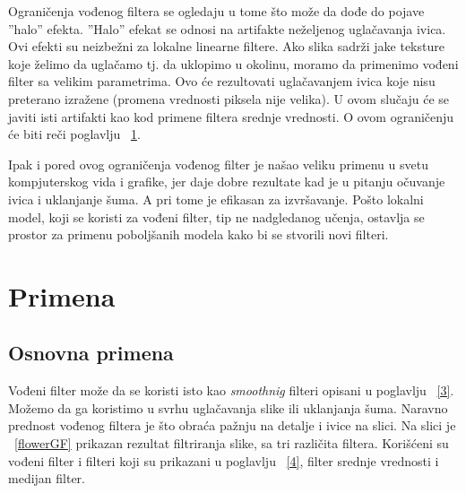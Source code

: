 \documentclass[a4paper,12pt,titlepage]{article}
\begin{document}
Ograničenja vođenog filtera se ogledaju u tome što može da dođe do pojave ''halo'' efekta. ''Halo'' efekat se odnosi na artifakte neželjenog uglačavanja ivica. Ovi efekti su neizbežni za lokalne linearne filtere. Ako slika sadrži jake teksture koje želimo da uglačamo tj. da uklopimo u okolinu, moramo da primenimo vođeni filter sa velikim parametrima. Ovo će rezultovati uglačavanjem ivica koje nisu preterano izražene (promena vrednosti piksela nije velika). U ovom slučaju će se javiti isti artifakti kao kod primene filtera srednje vrednosti. O ovom ograničenju će biti reči poglavlju ~\ref{5}.

Ipak i pored ovog ograničenja vođenog filter je našao veliku primenu u svetu kompjuterskog vida i grafike, jer daje dobre rezultate kad je u pitanju očuvanje ivica i uklanjanje šuma. A pri tome je efikasan za izvršavanje. Pošto lokalni model, koji se koristi za vođeni filter, tip ne nadgledanog učenja, ostavlja se prostor za primenu poboljšanih modela kako bi se stvorili novi filteri.

\section{Primena}\label{5}%

\subsection{Osnovna primena}%

Vođeni filter može da se koristi isto kao \emph{smoothnig} filteri opisani u poglavlju ~\ref{3}. Možemo da ga koristimo u svrhu uglačavanja slike ili uklanjanja šuma. Naravno prednost vođenog filtera je što obraća pažnju na detalje i ivice na slici. Na slici je ~\ref{flowerGF} prikazan rezultat filtriranja slike, sa tri različita filtera. Korišćeni su vođeni filter i filteri koji su prikazani u poglavlju ~\ref{4}, filter srednje vrednosti i medijan filter. 
\end{document}
